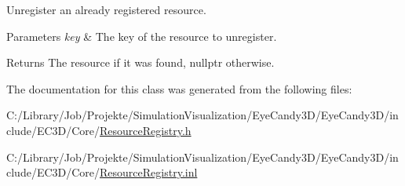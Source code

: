 Unregister an already registered resource. 


\begin{DoxyParams}{Parameters}
{\em key} & The key of the resource to unregister. \\
\hline
\end{DoxyParams}
\begin{DoxyReturn}{Returns}
The resource if it was found, nullptr otherwise. 
\end{DoxyReturn}


The documentation for this class was generated from the following files\+:\begin{DoxyCompactItemize}
\item 
C\+:/\+Library/\+Job/\+Projekte/\+Simulation\+Visualization/\+Eye\+Candy3\+D/\+Eye\+Candy3\+D/include/\+E\+C3\+D/\+Core/\mbox{\hyperlink{_resource_registry_8h}{Resource\+Registry.\+h}}\item 
C\+:/\+Library/\+Job/\+Projekte/\+Simulation\+Visualization/\+Eye\+Candy3\+D/\+Eye\+Candy3\+D/include/\+E\+C3\+D/\+Core/\mbox{\hyperlink{_resource_registry_8inl}{Resource\+Registry.\+inl}}\end{DoxyCompactItemize}
